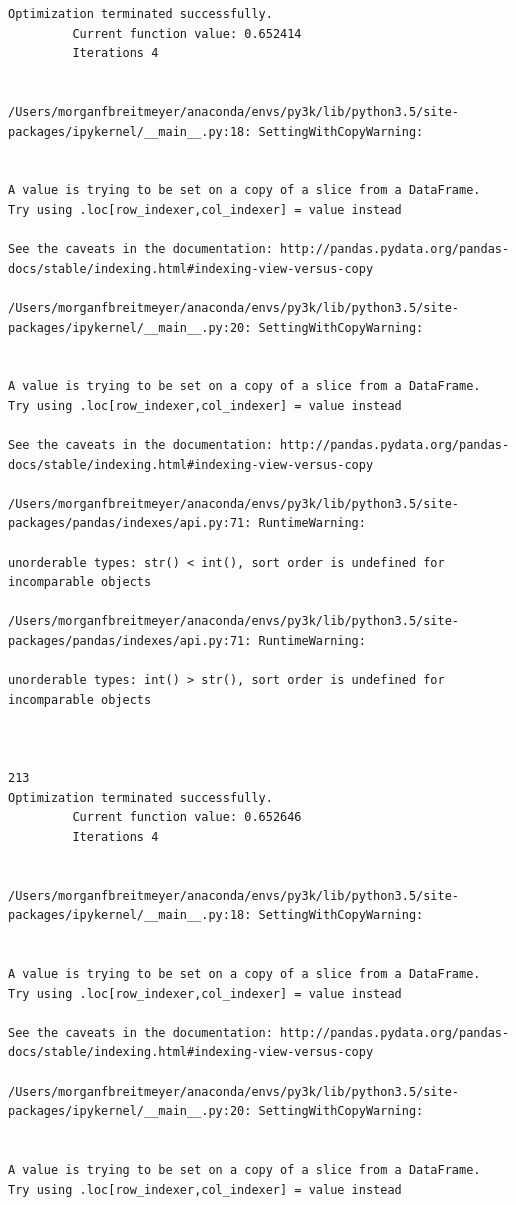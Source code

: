 \begin{lstlisting}
Optimization terminated successfully.
         Current function value: 0.652414
         Iterations 4


/Users/morganfbreitmeyer/anaconda/envs/py3k/lib/python3.5/site-packages/ipykernel/__main__.py:18: SettingWithCopyWarning:


A value is trying to be set on a copy of a slice from a DataFrame.
Try using .loc[row_indexer,col_indexer] = value instead

See the caveats in the documentation: http://pandas.pydata.org/pandas-docs/stable/indexing.html#indexing-view-versus-copy

/Users/morganfbreitmeyer/anaconda/envs/py3k/lib/python3.5/site-packages/ipykernel/__main__.py:20: SettingWithCopyWarning:


A value is trying to be set on a copy of a slice from a DataFrame.
Try using .loc[row_indexer,col_indexer] = value instead

See the caveats in the documentation: http://pandas.pydata.org/pandas-docs/stable/indexing.html#indexing-view-versus-copy

/Users/morganfbreitmeyer/anaconda/envs/py3k/lib/python3.5/site-packages/pandas/indexes/api.py:71: RuntimeWarning:

unorderable types: str() < int(), sort order is undefined for incomparable objects

/Users/morganfbreitmeyer/anaconda/envs/py3k/lib/python3.5/site-packages/pandas/indexes/api.py:71: RuntimeWarning:

unorderable types: int() > str(), sort order is undefined for incomparable objects



213
Optimization terminated successfully.
         Current function value: 0.652646
         Iterations 4


/Users/morganfbreitmeyer/anaconda/envs/py3k/lib/python3.5/site-packages/ipykernel/__main__.py:18: SettingWithCopyWarning:


A value is trying to be set on a copy of a slice from a DataFrame.
Try using .loc[row_indexer,col_indexer] = value instead

See the caveats in the documentation: http://pandas.pydata.org/pandas-docs/stable/indexing.html#indexing-view-versus-copy

/Users/morganfbreitmeyer/anaconda/envs/py3k/lib/python3.5/site-packages/ipykernel/__main__.py:20: SettingWithCopyWarning:


A value is trying to be set on a copy of a slice from a DataFrame.
Try using .loc[row_indexer,col_indexer] = value instead


\end{lstlisting}
